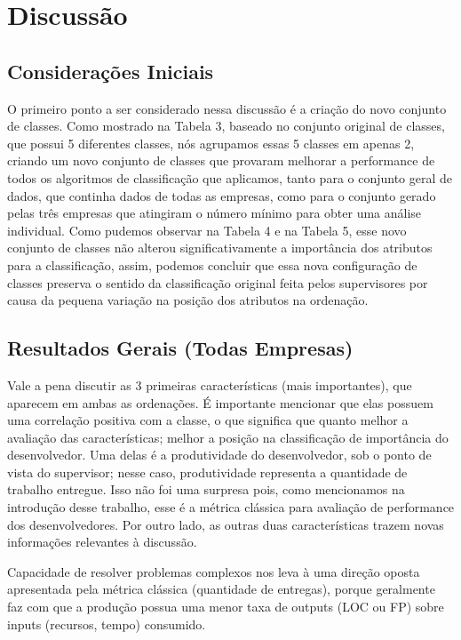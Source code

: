 \chapter[Discussão]{Discussão}

\section{Considerações Iniciais}
O primeiro ponto a ser considerado nessa discussão é a criação do novo conjunto de classes. Como mostrado na Tabela 3, baseado no conjunto original de classes, que possui 5 diferentes classes, nós agrupamos essas 5 classes em apenas 2, criando um novo conjunto de classes que provaram melhorar a performance de todos os algoritmos de classificação que aplicamos, tanto para o conjunto geral de dados, que continha dados de todas as empresas, como para o conjunto gerado pelas três empresas que atingiram o número mínimo para obter uma análise individual. Como pudemos observar na Tabela 4 e na Tabela 5, esse novo conjunto de classes não alterou significativamente a importância dos atributos para a classificação, assim, podemos concluir que essa nova configuração de classes preserva o sentido da classificação original feita pelos supervisores por causa da pequena variação na posição dos atributos na ordenação.
\section{Resultados Gerais (Todas Empresas)}
Vale a pena discutir as 3 primeiras características (mais importantes), que aparecem em ambas as ordenações. É importante mencionar que elas possuem uma correlação positiva com a classe, o que significa que quanto melhor a avaliação das características; melhor a posição na classificação de importância do desenvolvedor. Uma delas é a produtividade do desenvolvedor, sob o ponto de vista do supervisor; nesse caso, produtividade representa a quantidade de trabalho entregue. Isso não foi uma surpresa pois, como mencionamos na introdução desse trabalho, esse é a métrica clássica para avaliação de performance dos desenvolvedores. Por outro lado, as outras duas características trazem novas informações relevantes à discussão.

Capacidade de resolver problemas complexos nos leva à uma direção oposta apresentada pela métrica clássica (quantidade de entregas), porque geralmente faz com que a produção possua uma menor taxa de outputs (LOC ou FP) sobre inputs (recursos, tempo) consumido.

